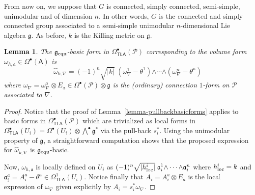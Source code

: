 \documentclass[number]{elsarticle}
\newtheorem{lemma}[theorem]{Lemma}
\theoremstyle{definition}
\theoremstyle{remark}
\numberwithin{equation}{section}
\begin{document}
From now on, we suppose that $G$ is connected, simply connected, semi-simple, unimodular and of dimension $n$. In other words, $G$ is the connected and simply connected group associated to a semi-simple unimodular $n$-dimensional Lie algebra ${{\mathfrak g}}$. As before, $k$ is the Killing metric on ${{\mathfrak g}}$.

\begin{lemma}
\label{lem-pullbackvolumeform}
The ${{\mathfrak g}}_{{\text{\textup{equ}}}}$-basic form in $\Omega^{\bullet}_{{{{\mathbf{\mathsf{{TLA}}}}}}}({{{{\mathcal{{P}}}}}})$ corresponding to the volume form $\omega_{h,{\mathfrak{a}}} \in \Omega^{\bullet}({{{{\mathbf{\mathsf{{A}}}}}}})$ is
\begin{equation*}
{\widehat{\omega}}_{k,\nabla} = (-1)^n \sqrt{|k|}\; (\omega_\nabla^{1} - \theta^1) {\mathord{\wedge}} \cdots {\mathord{\wedge}} (\omega_\nabla^{n} - \theta^n)
\end{equation*}
where $\omega_\nabla = \omega_\nabla^{a} \otimes E_a \in \Omega^{\bullet}({{{{\mathcal{{P}}}}}}) \otimes {{\mathfrak g}}$ is the (ordinary) connection $1$-form on ${{{{\mathcal{{P}}}}}}$ associated to $\nabla$.
\end{lemma}

\begin{proof}
Notice that the proof of Lemma~\ref{lemma-pullbackbasicforms} applies to basic forms in $\Omega^{\bullet}_{{{{\mathbf{\mathsf{{TLA}}}}}}}({{{{\mathcal{{P}}}}}})$ which are trivialized as local forms in $\Omega^{\bullet}_{{{{\mathbf{\mathsf{{TLA}}}}}}}(U_i) = \Omega^{\bullet}(U_i) \otimes {{\textstyle\bigwedge}}^{\bullet} {{\mathfrak g}}^\ast$ via the pull-back $s_i^\ast$. Using the unimodular property of ${{\mathfrak g}}$, a straightforward computation shows that the proposed expression for ${\widehat{\omega}}_{k,\nabla}$ is ${{\mathfrak g}}_{{\text{\textup{equ}}}}$-basic.

Now, $\omega_{h,{\mathfrak{a}}}$ is locally defined on $U_i$ as $(-1)^n \sqrt{|h^i_{{\text{\textup{loc}}}}|}\; {\mathfrak{a}}_i^{1} {\mathord{\wedge}} \cdots {\mathord{\wedge}} {\mathfrak{a}}_i^{n}$ where $h^i_{{\text{\textup{loc}}}} = k$ and ${\mathfrak{a}}_i^a = A_i^a - \theta^a \in \Omega^1_{{{{\mathbf{\mathsf{{TLA}}}}}}}(U_i)$. Notice finally that $A_i = A_i^a \otimes E_a$ is the local expression of $\omega_\nabla$ given explicitly by $A_i = s_i^\ast \omega_\nabla$.
\end{proof}
\end{document}
